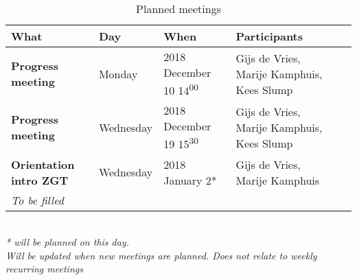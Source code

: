 \begin{table}[h!]
	\hspace*{-1.2cm}\begin{tabular}{p{29mm}|llll}
		\textbf{What} 		& 	Day	&	When	&	Participants \hfill \\
		\hline
		\textbf{Progress meeting} & Monday 		& 2018 December 10	14\textsuperscript{00} &	 Gijs de Vries, Marije Kamphuis, Kees Slump\\
		\rowcolor{Gray}
		 \textbf{Progress meeting} & Wednesday 	& 2018 December 19	15\textsuperscript{30} &	 Gijs de Vries, Marije Kamphuis, Kees Slump\\
		 \textbf{Orientation intro ZGT} \hfill & Wednesday & 2018 January 2* & Gijs de Vries, Marije Kamphuis\\
		 \rowcolor{Gray}
		  \textit{To be filled} & & & \\
		 \hline
	\end{tabular}\hspace*{-1.2cm} \\
	\textit{* will be planned on this day.}\\	
	\textit{Will be updated when new meetings are planned. Does not relate to weekly recurring meetings}
	\caption{Planned meetings}
	\label{tab:planned_meet}
\end{table}